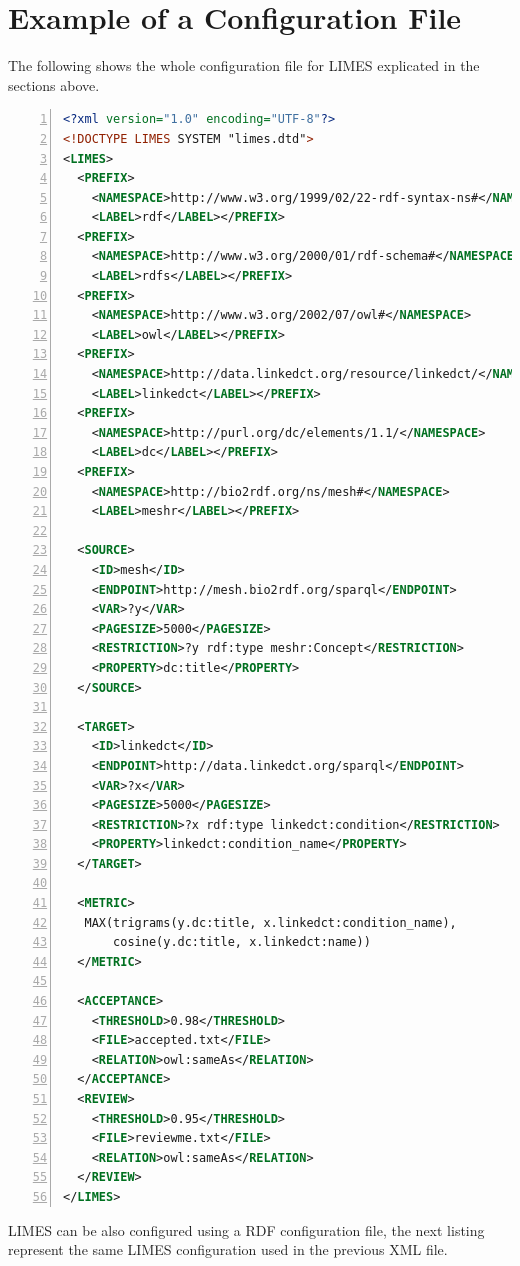 \documentclass[a4paper, 11pt]{article}
\begin{document}
\section{Example of a Configuration File}
The following shows the whole configuration file for LIMES explicated in the sections above.

\begin{ttfamily}
\begin{lstlisting}[language=XML,basicstyle=\scriptsize,numbers=left,numberstyle=\tiny]
<?xml version="1.0" encoding="UTF-8"?>
<!DOCTYPE LIMES SYSTEM "limes.dtd">
<LIMES>
  <PREFIX>
    <NAMESPACE>http://www.w3.org/1999/02/22-rdf-syntax-ns#</NAMESPACE>
    <LABEL>rdf</LABEL></PREFIX>
  <PREFIX>
    <NAMESPACE>http://www.w3.org/2000/01/rdf-schema#</NAMESPACE>
    <LABEL>rdfs</LABEL></PREFIX>
  <PREFIX>
    <NAMESPACE>http://www.w3.org/2002/07/owl#</NAMESPACE>
    <LABEL>owl</LABEL></PREFIX>
  <PREFIX>
    <NAMESPACE>http://data.linkedct.org/resource/linkedct/</NAMESPACE>
    <LABEL>linkedct</LABEL></PREFIX>
  <PREFIX>
    <NAMESPACE>http://purl.org/dc/elements/1.1/</NAMESPACE>
    <LABEL>dc</LABEL></PREFIX>
  <PREFIX>
    <NAMESPACE>http://bio2rdf.org/ns/mesh#</NAMESPACE>
    <LABEL>meshr</LABEL></PREFIX>

  <SOURCE>
    <ID>mesh</ID>
    <ENDPOINT>http://mesh.bio2rdf.org/sparql</ENDPOINT>
    <VAR>?y</VAR>
    <PAGESIZE>5000</PAGESIZE>
    <RESTRICTION>?y rdf:type meshr:Concept</RESTRICTION>
    <PROPERTY>dc:title</PROPERTY>
  </SOURCE>

  <TARGET>
    <ID>linkedct</ID>
    <ENDPOINT>http://data.linkedct.org/sparql</ENDPOINT>
    <VAR>?x</VAR>
    <PAGESIZE>5000</PAGESIZE>
    <RESTRICTION>?x rdf:type linkedct:condition</RESTRICTION>
    <PROPERTY>linkedct:condition_name</PROPERTY>
  </TARGET>

  <METRIC>
   MAX(trigrams(y.dc:title, x.linkedct:condition_name),
       cosine(y.dc:title, x.linkedct:name))
  </METRIC>

  <ACCEPTANCE>
    <THRESHOLD>0.98</THRESHOLD>
    <FILE>accepted.txt</FILE>
    <RELATION>owl:sameAs</RELATION>
  </ACCEPTANCE>
  <REVIEW>
    <THRESHOLD>0.95</THRESHOLD>
    <FILE>reviewme.txt</FILE>
    <RELATION>owl:sameAs</RELATION>
  </REVIEW>
</LIMES>
\end{lstlisting}
\end{ttfamily}

LIMES can be also configured using a RDF configuration file, the next listing represent the same LIMES configuration used in the previous XML file.
\end{document}
